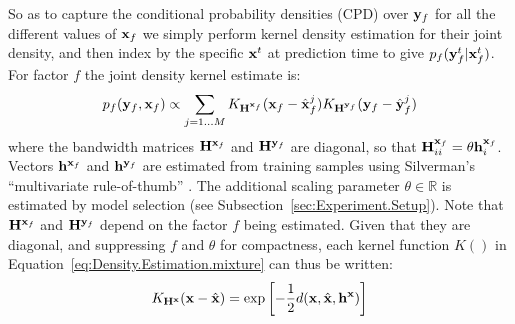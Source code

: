 So as to capture the conditional probability densities (CPD) over $\mathbf{y}_f$ for all the different values of $\mathbf{x}_f$ we simply perform kernel density estimation for their joint density, and then  index by the specific $\mathbf{x}^t$ at prediction time to give $p_f(\mathbf{y}_f^t|\mathbf{x}_f^t)$. For factor $f$ the joint density kernel estimate is:
\begin{equation}
p_f(\by_f,\bx_f) \propto \mathop{\sum}_{j=1 \ldots M}
K_{\mathbf{H}^{\bx_f}}(\bx_f - \hat{\bx}_f^j)
K_{\mathbf{H}^{\by_f}}(\by_f - \hat{\by}_f^j)
\label{eq:Density.Estimation.mixture}
\end{equation}
\noindent where the bandwidth matrices  $\mathbf{H}^{\mathbf{x}_f} $ and $\mathbf{H}^{\mathbf{y}_f} $ are diagonal, so that $\mathbf{H}^{\mathbf{x}_f}_{ii}  = \theta \mathbf{h}^{\mathbf{x}_f}_i$. Vectors $\mathbf{h}^{\mathbf{x}_f}$ and $\mathbf{h}^{\mathbf{y}_f}$  are estimated from training samples using Silverman's ``multivariate rule-of-thumb'' \cite{scott2004multi-dimensional}. The additional scaling parameter $\theta \in \mathbb{R}$ is estimated by model selection (see Subsection~\ref{sec:Experiment.Setup}). Note that $\mathbf{H}^{\mathbf{x}_f}$ and $\mathbf{H}^{\mathbf{y}_f}$ depend on the factor $f$ being estimated. Given that they are diagonal, and suppressing $f$ and $\theta$ for compactness, each kernel function $K()$ in Equation~\eqref{eq:Density.Estimation.mixture} can thus be written:
\begin{equation}
K_{\mathbf{H}^\bx}(\bx - \hat{\bx}) = \exp \left[-\frac{1}{2}d(\bx, \hat{\bx}, \mathbf{h^{x}}) \right]
\label{eq:Density.Estimation.kernel}
\end{equation}

